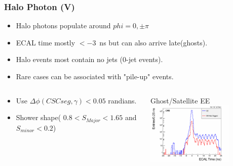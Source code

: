 \documentclass{beamer}
\begin{document}
\begin{frame}
\frametitle{Halo Photon (V)}
 \begin{minipage}[t]{0.85\paperwidth}
      \begin{tcolorbox}[colback=UNL@Cream!5,colframe=UMN@Maroon!40 ,title=\textcolor{black}{\textbf{Halo Photon Event Properties}}]
       \begin{itemize}
          \item Halo photons populate around $phi=0, \pm \pi$
          \item ECAL time mostly $ < -3$~ns but can also arrive late(ghosts).
          \item Halo events most contain no jets ($0$-jet events).
          \item Rare cases can be associated with "pile-up" events.     
       \end{itemize}  
      \end{tcolorbox}
  \end{minipage}
  \begin{minipage}[t]{0.9\paperwidth}
     \begin{columns}
        \begin{tcolorbox}[colback=UNL@Cream!5,colframe=UMN@Maroon!40,title=\textcolor{black}{\textbf{Halo Photon Tagging Criteria}}] 
        \begin{itemize}
         \item Use $\Delta\phi(CSC seg, \gamma) < 0.05$ randians.
         \item Shower shape( $0.8 < S_{Major} < 1.65 $ and $ S_{minor} < 0.2 $)
        \end{itemize}
        \end{tcolorbox}
        \begin{varblock}[2.5cm]{Ghost/Satellite EE}
        \centering      
        \includegraphics[height=2.95cm,width=0.29\paperwidth]{THESISPLOTS/halo_EE_Time.png} 
        \end{varblock}
     \end{columns} 
  \end{minipage}   
\end{frame}
\end{document}
